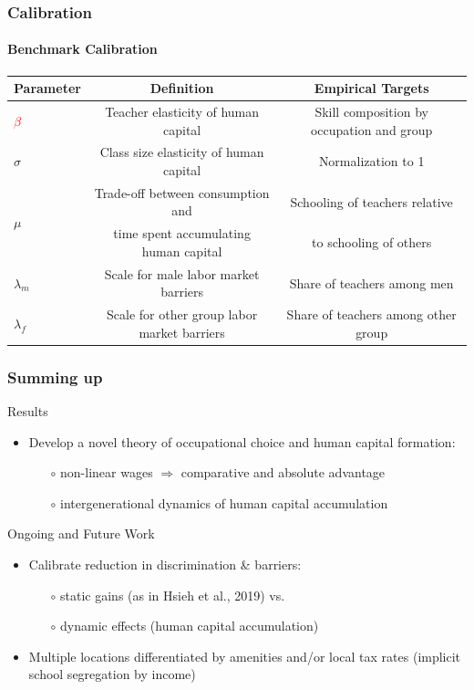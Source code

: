 \documentclass[11pt]{beamer}
\begin{document}
		\begin{frame}
			\frametitle{Calibration}
			\framesubtitle{Benchmark Calibration}
			\tiny
			\begin{table}[h!]
				\centering
				\begin{tabular}{lcc}
					\toprule
					\toprule
					Parameter & Definition & Empirical Targets\\
					\midrule
					\textcolor{red}{$\beta$} & Teacher elasticity of human capital & Skill composition by occupation and group \\
					$\sigma$ & Class size elasticity of human capital & Normalization to 1\\
					\multirow{2}{*}{$\mu$} &  Trade-off between consumption and & Schooling of teachers relative\\
					& time spent accumulating human capital & to schooling of others\\
					$\lambda_m$ & Scale for male labor market barriers & Share of teachers among men\\
					$\lambda_f$ & Scale for other group labor market barriers & Share of teachers among other group\\
					\bottomrule
				\end{tabular}
				\label{tab:calibr}
			\end{table}
		\end{frame}
		
			
		
		\begin{frame}
			\frametitle{Summing up}
			\textcolor{tblue}{Results}
			\begin{itemize}
				\item Develop a novel theory of occupational choice and human capital formation: 
				\begin{itemize}
					\item[$\circ$] non-linear wages $\Rightarrow$ comparative and absolute advantage
					\item[$\circ$] intergenerational dynamics of human capital accumulation
				\end{itemize}
			\end{itemize}
			\vfill
			\textcolor{tblue}{Ongoing and Future Work}
			\begin{itemize}
				\item Calibrate reduction in discrimination \& barriers:
				\begin{itemize}
					\item[$\circ$] static gains (as in Hsieh et al., 2019) vs.
					\item[$\circ$] dynamic effects (human capital accumulation)
				\end{itemize}
				\item Multiple locations differentiated by amenities and/or local tax rates (implicit school segregation by income)
			\end{itemize}
		\end{frame}
		
\end{document}
